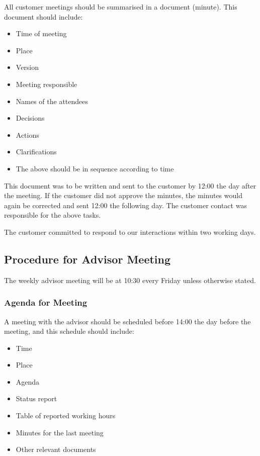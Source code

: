 All customer meetings should be summarised in a document (minute). This document should include:
\begin{itemize}
	\item Time of meeting
	\item Place
	\item Version
	\item Meeting responsible
	\item Names of the attendees
	\item Decisions
	\item Actions
	\item Clarifications
	\item The above should be in sequence according to time
\end{itemize}

This document was to be written and sent to the customer by 12:00 the day after the meeting. If the customer did not approve the minutes, the minutes would again be corrected and sent 12:00 the following day. The customer contact was responsible for the above tasks.

The customer committed to respond to our interactions within two working days.

\subsection{Procedure for Advisor Meeting}
The weekly advisor meeting will be at 10:30 every Friday unless otherwise stated.

\subsubsection{Agenda for Meeting}
A meeting with the advisor should be scheduled before 14:00 the day before the meeting, and this schedule should include:
\begin{itemize}
	\item Time
	\item Place
	\item Agenda
	\item Status report
	\item Table of reported working hours
	\item Minutes for the last meeting
	\item Other relevant documents
\end{itemize}

